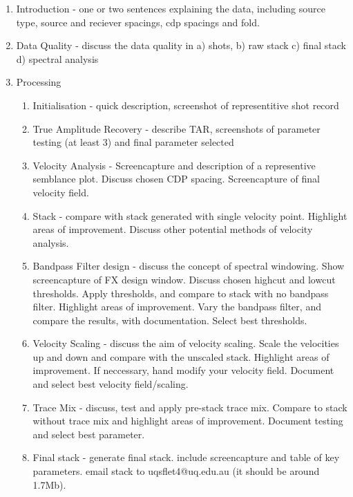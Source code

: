 \begin{enumerate}
\item Introduction - one or two sentences explaining the data, including source type, source and reciever spacings, cdp spacings and fold.
\item Data Quality - discuss the data quality in a) shots, b) raw stack c) final stack d) spectral analysis
\item Processing
\begin{enumerate}
\item Initialisation - quick description, screenshot of representitive shot record
\item True Amplitude Recovery - describe TAR, screenshots of parameter testing (at least 3) and final parameter selected
\item Velocity Analysis - Screencapture and description of a representive semblance plot.  Discuss chosen CDP spacing.   Screencapture of final velocity field.
\item Stack - compare with stack generated with single velocity point. Highlight areas of improvement. Discuss other potential methods of velocity analysis. 
\item Bandpass Filter design - discuss the concept of spectral windowing.  Show screencapture of FX design window.  Discuss chosen highcut and lowcut thresholds.  Apply thresholds, and compare to stack with no bandpass filter. Highlight areas of improvement.  Vary the bandpass filter, and compare the results, with documentation.  Select best thresholds. 
\item Velocity Scaling - discuss the aim of velocity scaling.  Scale the velocities up and down and compare with the unscaled stack.  Highlight areas of improvement.  If neccessary, hand modify your velocity field.  Document and select best velocity field/scaling.
\item Trace Mix - discuss, test and apply pre-stack trace mix.   Compare to stack without trace mix and highlight areas of improvement.  Document testing and select best parameter.
\item Final stack - generate final stack.  include screencapture and table of key parameters.  email stack to uqsflet4@uq.edu.au (it should be around 1.7Mb).
\end{enumerate}
\end{enumerate}
